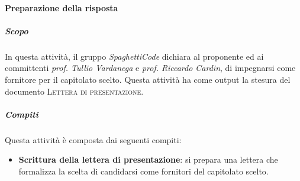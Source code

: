 \paragraph{Preparazione della risposta}
\label{par:preparazione_della_risposta}
\subparagraph{Scopo}
\label{par:preparazione_della_risposta:scopo}
In questa attività, il gruppo \emph{SpaghettiCode} dichiara al proponente ed ai committenti \emph{prof. Tullio Vardanega} e \emph{prof. Riccardo Cardin}, di impegnarsi come fornitore per il capitolato scelto. Questa attività ha come output la stesura del documento \textsc{Lettera di presentazione}.\\
\subparagraph{Compiti}
\label{par:preparazione_della_risposta:compiti}
Questa attività è composta dai seguenti compiti:
\begin{itemize}
    \item \textbf{Scrittura della lettera di presentazione}: si prepara una lettera che formalizza la scelta di candidarsi come fornitori del capitolato scelto.
\end{itemize}

